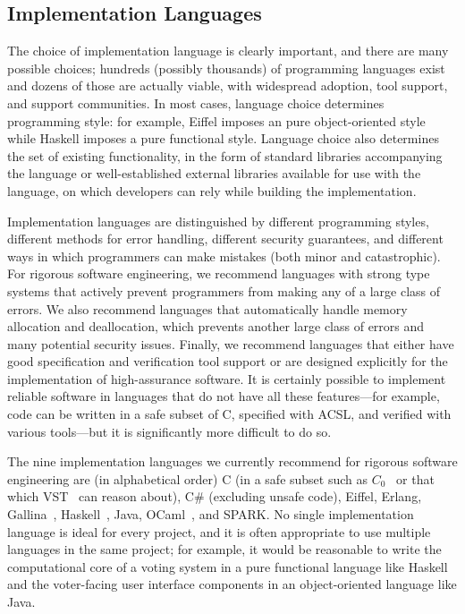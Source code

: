 \subsection{Implementation Languages}

The choice of implementation language is clearly important, and there
are many possible choices; hundreds (possibly thousands) of
programming languages exist and dozens of those are actually viable,
with widespread adoption, tool support, and support communities. In
most cases, language choice determines programming style: for example,
Eiffel imposes an pure object-oriented style while Haskell imposes a
pure functional style. Language choice also determines the set of
existing functionality, in the form of standard libraries accompanying
the language or well-established external libraries available for use
with the language, on which developers can rely while building the
implementation. 

Implementation languages are distinguished by different programming
styles, different methods for error handling, different security
guarantees, and different ways in which programmers can make mistakes
(both minor and catastrophic). For rigorous software engineering, we
recommend languages with strong type systems that actively prevent
programmers from making any of a large class of errors. We also
recommend languages that automatically handle memory allocation and
deallocation, which prevents another large class of errors and many
potential security issues. Finally, we recommend languages that either
have good specification and verification tool support or are designed
explicitly for the implementation of high-assurance software. It is
certainly possible to implement reliable software in languages that do
not have all these features---for example, code can be written in a
safe subset of C, specified with ACSL, and verified with various
tools---but it is significantly more difficult to do so.

The nine implementation languages we currently recommend for rigorous
software engineering are (in alphabetical order) C (in a safe subset
such as $C_{0}$~\cite{C0} or that which VST~\cite{VST} can reason
about), C\# (excluding unsafe code), Eiffel, Erlang,
Gallina~\cite{Gallina}, Haskell~\cite{Haskell}, Java,
OCaml~\cite{OCaml}, and SPARK.  No single implementation language is ideal for
every project, and it is often appropriate to use multiple languages
in the same project; for example, it would be reasonable to write the
computational core of a voting system in a pure functional language
like Haskell and the voter-facing user interface components in an
object-oriented language like Java.

